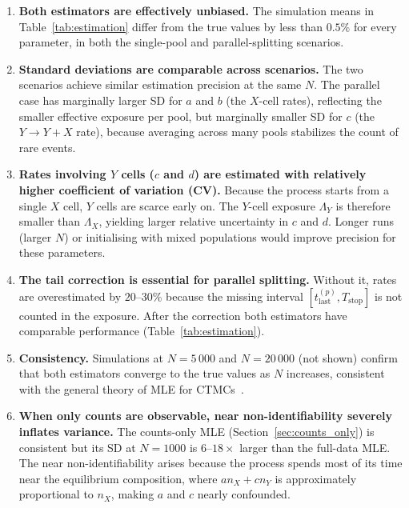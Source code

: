 \documentclass[12pt]{article}
\begin{document}
\begin{enumerate}
  \item \textbf{Both estimators are effectively unbiased.}
        The simulation means in Table~\ref{tab:estimation} differ from the
        true values by less than $0.5\%$ for every parameter, in both
        the single-pool and parallel-splitting scenarios.

  \item \textbf{Standard deviations are comparable across scenarios.}
        The two scenarios achieve similar estimation precision at the same
        $N$.  The parallel case has marginally larger SD for $a$ and $b$
        (the $X$-cell rates), reflecting the smaller effective exposure
        per pool, but marginally smaller SD for $c$ (the $Y\!\to\!Y{+}X$
        rate), because averaging across many pools stabilizes the count
        of rare events.

  \item \textbf{Rates involving $Y$ cells ($c$ and $d$) are estimated with
        relatively higher coefficient of variation (CV).}
        Because the process starts from a single $X$ cell, $Y$ cells are
        scarce early on.  The $Y$-cell exposure $\Lambda_Y$ is therefore
        smaller than $\Lambda_X$, yielding larger relative uncertainty in
        $c$ and $d$.  Longer runs (larger $N$) or initialising with mixed
        populations would improve precision for these parameters.

  \item \textbf{The tail correction is essential for parallel splitting.}
        Without it, rates are overestimated by $20$--$30\%$ because the
        missing interval $[t^{(p)}_{\mathrm{last}}, T_{\mathrm{stop}}]$ is
        not counted in the exposure.  After the correction both estimators
        have comparable performance (Table~\ref{tab:estimation}).

  \item \textbf{Consistency.}  Simulations at $N = 5\,000$ and
        $N = 20\,000$ (not shown) confirm that both estimators converge to
        the true values as $N$ increases, consistent with the general
        theory of MLE for CTMCs~\cite{athreya1972}.

  \item \textbf{When only counts are observable, near non-identifiability
        severely inflates variance.}
        The counts-only MLE (Section~\ref{sec:counts_only}) is consistent
        but its SD at $N = 1000$ is $6$--$18\times$ larger than the
        full-data MLE.  The near non-identifiability arises because the
        process spends most of its time near the equilibrium composition,
        where $a n_X + c n_Y$ is approximately proportional to $n_X$,
        making $a$ and $c$ nearly confounded.


\end{enumerate}
\end{document}
